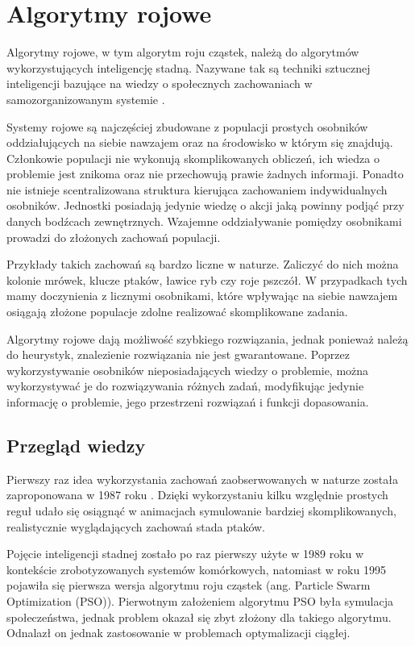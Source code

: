 \chapter{Algorytmy rojowe}
\label{cha:pso}
Algorytmy rojowe, w tym algorytm roju cząstek, należą do algorytmów wykorzystujących inteligencję stadną. Nazywane tak są techniki sztucznej inteligencji bazujące na wiedzy o społecznych zachowaniach w samozorganizowanym systemie \cite{psowstep}. 

Systemy rojowe są najczęściej zbudowane z populacji prostych osobników oddziałujących na siebie nawzajem oraz na środowisko w którym się znajdują. Członkowie populacji nie wykonują skomplikowanych obliczeń, ich wiedza o problemie jest znikoma oraz nie przechowują prawie żadnych informaji. Ponadto nie istnieje scentralizowana struktura kierująca zachowaniem indywidualnych osobników. Jednostki posiadają jedynie wiedzę o akcji jaką powinny podjąć przy danych bodźcach zewnętrznych. Wzajemne oddziaływanie pomiędzy osobnikami prowadzi do złożonych zachowań populacji.

Przykłady takich zachowań są bardzo liczne w naturze. Zaliczyć do nich można kolonie mrówek, klucze ptaków, ławice ryb czy roje pszczół. W przypadkach tych mamy doczynienia z licznymi osobnikami, które wpływając na siebie nawzajem osiągają złożone populacje zdolne realizować skomplikowane zadania.

Algorytmy rojowe dają możliwość szybkiego rozwiązania, jednak ponieważ należą do heurystyk, znalezienie rozwiązania nie jest gwarantowane. Poprzez wykorzystywanie osobników nieposiadających wiedzy o problemie, można wykorzystywać je do rozwiązywania różnych zadań, modyfikując jedynie informację o problemie, jego przestrzeni rozwiązań i funkcji dopasowania. 

\section{Przegląd wiedzy}
\label{sec:historiarojowych}
Pierwszy raz idea wykorzystania zachowań zaobserwowanych w naturze została zaproponowana w 1987 roku \cite{Reynolds87}. Dzięki wykorzystaniu kilku względnie prostych reguł udało się osiągnąć w animacjach symulowanie bardziej skomplikowanych, realistycznie wyglądających zachowań stada ptaków. 

Pojęcie inteligencji stadnej zostało po raz pierwszy użyte w 1989 roku \cite{BeniWang89} w kontekście zrobotyzowanych systemów komórkowych, natomiast w roku 1995 \cite{KennedyEberhart95} pojawiła się pierwsza wersja algorytmu roju cząstek (ang. Particle Swarm Optimization (PSO)). Pierwotnym założeniem algorytmu PSO była symulacja społeczeństwa, jednak problem okazał się zbyt złożony dla takiego algorytmu. Odnalazł on jednak zastosowanie w problemach optymalizacji ciągłej.

